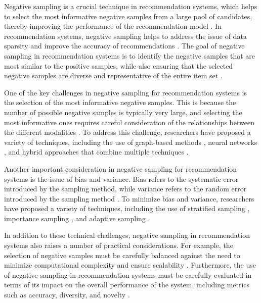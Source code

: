 \documentclass[11pt,a4paper]{article}
\begin{document}
Negative sampling is a crucial technique in recommendation systems, which helps to select the most informative negative samples from a large pool of candidates, thereby improving the performance of the recommendation model \cite{doi:10.24963/ijcai.2017/446}. In recommendation systems, negative sampling helps to address the issue of data sparsity and improve the accuracy of recommendations \cite{arxiv:1608.07400}. The goal of negative sampling in recommendation systems is to identify the negative samples that are most similar to the positive samples, while also ensuring that the selected negative samples are diverse and representative of the entire item set \cite{arxiv:1905.01997}.

One of the key challenges in negative sampling for recommendation systems is the selection of the most informative negative samples. This is because the number of possible negative samples is typically very large, and selecting the most informative ones requires careful consideration of the relationships between the different modalities \cite{doi:10.1609/aaai.v34i04.6094}. To address this challenge, researchers have proposed a variety of techniques, including the use of graph-based methods \cite{doi:10.1609/aaai.v34i04.5751}, neural networks \cite{doi:10.1155/2022/9593957}, and hybrid approaches that combine multiple techniques \cite{doi:10.1109/access.2019.2905534}.

Another important consideration in negative sampling for recommendation systems is the issue of bias and variance. Bias refers to the systematic error introduced by the sampling method, while variance refers to the random error introduced by the sampling method \cite{doi:10.1145/3434185}. To minimize bias and variance, researchers have proposed a variety of techniques, including the use of stratified sampling \cite{doi:10.1145/3394486.3403226}, importance sampling \cite{doi:10.1609/aaai.v33i01.330137}, and adaptive sampling \cite{doi:10.1609/aaai.v32i1.11689}.

In addition to these technical challenges, negative sampling in recommendation systems also raises a number of practical considerations. For example, the selection of negative samples must be carefully balanced against the need to minimize computational complexity and ensure scalability \cite{doi:10.1145/3366423.3380303}. Furthermore, the use of negative sampling in recommendation systems must be carefully evaluated in terms of its impact on the overall performance of the system, including metrics such as accuracy, diversity, and novelty \cite{doi:10.1587/transinf.2017edr0003}.
\end{document}
